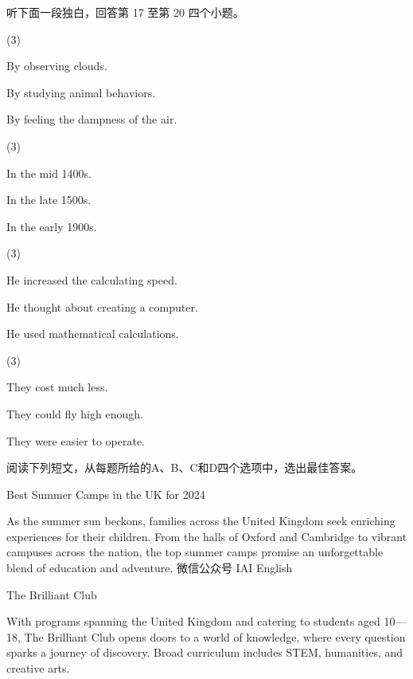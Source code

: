 \documentclass{英语试卷}
\begin{document}
\par 听下面一段独白，回答第 17 至第 20 四个小题。\par
{}
\begin{choices}(3)
  \item By observing clouds.
  \item By studying animal behaviors.
  \item By feeling the dampness of the air.
\end{choices}
\begin{choices}(3)
  \item In the mid 1400s.
  \item In the late 1500s.
  \item In the early 1900s.
\end{choices}
\begin{choices}(3)
  \item He increased the calculating speed.
  \item He thought about creating a computer.
  \item He used mathematical calculations.
\end{choices}
\begin{choices}(3)
  \item They cost much less.
  \item They could fly high enough.
  \item They were easier to operate.
\end{choices}
\par 阅读下列短文，从每题所给的A、B、C和D四个选项中，选出最佳答案。\par
\par Best Summer Camps in the UK for 2024\par
\par As the summer sun beckons, families across the United Kingdom seek enriching experiences for their children. From the halls of Oxford and Cambridge to vibrant campuses across the nation, the top summer camps promise an unforgettable blend of education and adventure. 微信公众号 IAI English\par
\par The Brilliant Club\par
\par With programs spanning the United Kingdom and catering to students aged 10—18, The Brilliant Club opens doors to a world of knowledge, where every question sparks a journey of discovery. Broad curriculum includes STEM, humanities, and creative arts.\par
\end{document}
